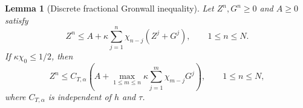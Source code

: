 \documentclass[11pt,a4paper]{article}
\numberwithin{equation}{section}
\theoremstyle{plain}
\newtheorem{lemma}[theorem]{Lemma}
\theoremstyle{definition}
\theoremstyle{remark}
\begin{document}



\begin{lemma}[Discrete fractional Gronwall inequality]
\label{lem:dgronwall}
Let $Z^n,G^n\ge0$ and $A\ge0$ satisfy
\[
Z^n\le A+\kappa\sum_{j=1}^n
\chi_{n-j}(Z^j+G^j),
\qquad 1\le n\le N.
\]
If $\kappa\chi_0\le 1/2$, then
\[
Z^n\le C_{T,\alpha}\left(
A+\max_{1\le m\le n}
\kappa\sum_{j=1}^m\chi_{m-j}G^j
\right),
\qquad 1\le n\le N,
\]
where $C_{T,\alpha}$ is independent of $h$ and $\tau$.
\end{lemma}

\end{document}
